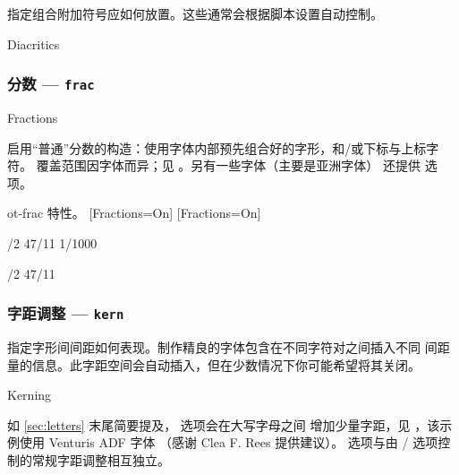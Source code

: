 \documentclass[a4paper]{l3doc}
\begin{document}
指定组合附加符号应如何放置。这些通常会根据脚本设置自动控制。

\begin{features}{Diacritics}
\end{features}


\subsubsection{分数 --- \texttt{frac}}

\begin{features}{Fractions}
\end{features}

启用“普通”分数的构造：使用字体内部预先组合好的字形，和/或下标与上标字符。
覆盖范围因字体而异；见 。另有一些字体（主要是亚洲字体）
还提供  选项。

\begin{Lexample}{ot-frac}{ 特性。}
\setsansfont{IBMPlexSans-Regular.otf}[Fractions=On]
\setmonofont{IBMPlexMono-Regular.otf}[Fractions=On]

/2 47/11 1/1000 \par
{}/2 47/11
\end{Lexample}



\subsubsection{字距调整 --- \texttt{kern}}
\label{sec:kerning}

指定字形间间距如何表现。制作精良的字体包含在不同字符对之间插入不同
间距量的信息。此字距空间会自动插入，但在少数情况下你可能希望将其关闭。

\begin{features}{Kerning}
\end{features}

如 \vref{sec:letters} 末尾简要提及， 选项会在大写字母之间
增加少量字距，见 ，该示例使用 Venturis ADF 字体
（感谢 Clea F. Rees 提供建议）。 选项与由 /
选项控制的常规字距调整相互独立。
\end{document}

